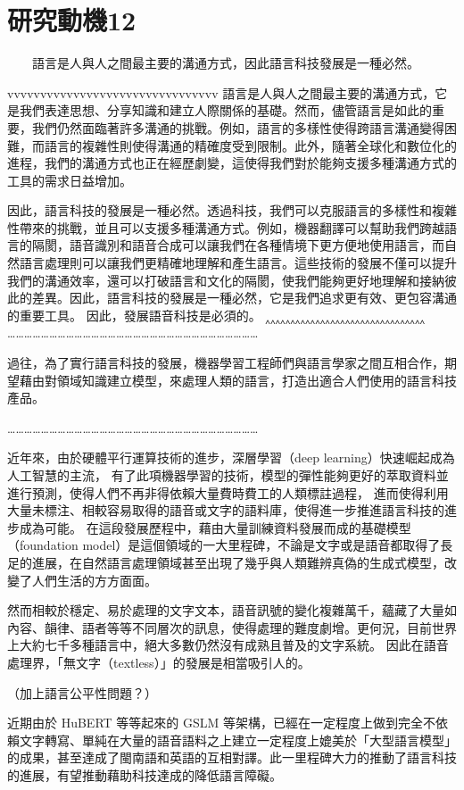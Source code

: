 \section{研究動機12}
　　語言是人與人之間最主要的溝通方式，因此語言科技發展是一種必然。

    vvvvvvvvvvvvvvvvvvvvvvvvvvvvvvvv
    語言是人與人之間最主要的溝通方式，它是我們表達思想、分享知識和建立人際關係的基礎。然而，儘管語言是如此的重要，我們仍然面臨著許多溝通的挑戰。例如，語言的多樣性使得跨語言溝通變得困難，而語言的複雜性則使得溝通的精確度受到限制。此外，隨著全球化和數位化的進程，我們的溝通方式也正在經歷劇變，這使得我們對於能夠支援多種溝通方式的工具的需求日益增加。

    因此，語言科技的發展是一種必然。透過科技，我們可以克服語言的多樣性和複雜性帶來的挑戰，並且可以支援多種溝通方式。例如，機器翻譯可以幫助我們跨越語言的隔閡，語音識別和語音合成可以讓我們在各種情境下更方便地使用語言，而自然語言處理則可以讓我們更精確地理解和產生語言。這些技術的發展不僅可以提升我們的溝通效率，還可以打破語言和文化的隔閡，使我們能夠更好地理解和接納彼此的差異。因此，語言科技的發展是一種必然，它是我們追求更有效、更包容溝通的重要工具。
    因此，發展語音科技是必須的。
    ‸‸‸‸‸‸‸‸‸‸‸‸‸‸‸‸‸‸‸‸‸‸‸‸‸‸‸‸‸‸‸‸
    ………………………………………………………………………………

    過往，為了實行語言科技的發展，機器學習工程師們與語言學家之間互相合作，期望藉由對領域知識建立模型，來處理人類的語言，打造出適合人們使用的語言科技產品。

    ………………………………………………………………………………

    近年來，由於硬體平行運算技術的進步，深層學習（deep learning）快速崛起成為人工智慧的主流，
有了此項機器學習的技術，模型的彈性能夠更好的萃取資料並進行預測，使得人們不再非得依賴大量費時費工的人類標註過程，
進而使得利用大量未標注、相較容易取得的語音或文字的語料庫，使得進一步推進語言科技的進步成為可能。
在這段發展歷程中，藉由大量訓練資料發展而成的基礎模型（foundation model）是這個領域的一大里程碑，不論是文字或是語音都取得了長足的進展，在自然語言處理領域甚至出現了幾乎與人類難辨真偽的生成式模型，改變了人們生活的方方面面。

    然而相較於穩定、易於處理的文字文本，語音訊號的變化複雜萬千，蘊藏了大量如內容、韻律、語者等等不同層次的訊息，使得處理的難度劇增。更何況，目前世界上大約七千多種語言中，絕大多數仍然沒有成熟且普及的文字系統。
因此在語音處理界，「無文字（textless）」的發展是相當吸引人的。

（加上語言公平性問題？）

    近期由於 HuBERT 等等起來的 GSLM 等架構，已經在一定程度上做到完全不依賴文字轉寫、單純在大量的語音語料之上建立一定程度上媲美於「大型語言模型」的成果，甚至達成了閩南語和英語的互相對譯。此一里程碑大力的推動了語言科技的進展，有望推動藉助科技達成的降低語言障礙。

